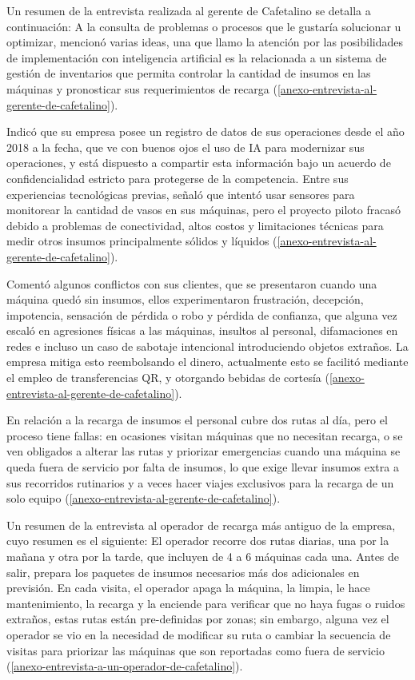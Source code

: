 Un resumen de la entrevista realizada al gerente de Cafetalino se detalla a continuación: A la consulta de problemas o procesos que le gustaría solucionar u optimizar, mencionó varias ideas, una que llamo la atención por las posibilidades de implementación con inteligencia artificial es la relacionada a un sistema de gestión de inventarios que permita controlar la cantidad de insumos en las máquinas y pronosticar sus requerimientos de recarga (\ref{anexo-entrevista-al-gerente-de-cafetalino}).

Indicó que su empresa posee un registro de datos de sus operaciones desde el año 2018 a la fecha, que ve con buenos ojos el uso de IA para modernizar sus operaciones, y está dispuesto a compartir esta información bajo un acuerdo de confidencialidad estricto para protegerse de la competencia. Entre sus experiencias tecnológicas previas, señaló que intentó usar sensores para monitorear la cantidad de vasos en sus máquinas, pero el proyecto piloto fracasó debido a problemas de conectividad, altos costos y limitaciones técnicas para medir otros insumos principalmente sólidos y líquidos (\ref{anexo-entrevista-al-gerente-de-cafetalino}).

Comentó algunos conflictos con sus clientes, que se presentaron cuando una máquina quedó sin insumos, ellos experimentaron frustración, decepción, impotencia, sensación de pérdida o robo y pérdida de confianza, que alguna vez escaló en agresiones físicas a las máquinas, insultos al personal, difamaciones en redes e incluso un caso de sabotaje intencional introduciendo objetos extraños. La empresa mitiga esto reembolsando el dinero, actualmente esto se facilitó mediante el empleo de transferencias QR, y otorgando bebidas de cortesía (\ref{anexo-entrevista-al-gerente-de-cafetalino}).

En relación a la recarga de insumos el personal cubre dos rutas al día, pero el proceso tiene fallas: en ocasiones visitan máquinas que no necesitan recarga, o se ven obligados a alterar las rutas y priorizar emergencias cuando una máquina se queda fuera de servicio por falta de insumos, lo que exige llevar insumos extra a sus recorridos rutinarios y a veces hacer viajes exclusivos para la recarga de un solo equipo (\ref{anexo-entrevista-al-gerente-de-cafetalino}).

Un resumen de la entrevista al operador de recarga más antiguo de la empresa, cuyo resumen es el siguiente: El operador recorre dos rutas diarias, una por la mañana y otra por la tarde, que incluyen de 4 a 6 máquinas cada una. Antes de salir, prepara los paquetes de insumos necesarios más dos adicionales en previsión. En cada visita, el operador apaga la máquina, la limpia, le hace mantenimiento, la recarga y la enciende para verificar que no haya fugas o ruidos extraños, estas rutas están pre-definidas por zonas; sin embargo, alguna vez el operador se vio en la necesidad de modificar su ruta o cambiar la secuencia de visitas para priorizar las máquinas que son reportadas como fuera de servicio (\ref{anexo-entrevista-a-un-operador-de-cafetalino}).

